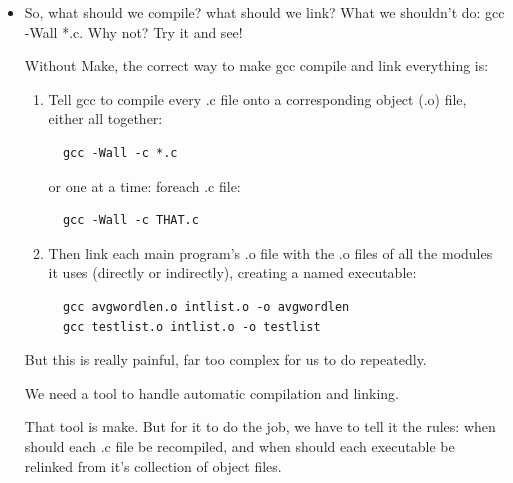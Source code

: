 \documentclass[aspectratio=169]{beamer}
\begin{document}
\begin{frame}[fragile]
    \begin{itemize}
    \item
    So, what should we compile?  what should we link?
    \pitem
    What we shouldn't do: \alert{gcc -Wall *.c}.  Why not?  Try it and see!

    \pitem
    Without Make, the correct way to make gcc compile and link everything is:

    \begin{enumerate}
    \pause
    \item
    Tell gcc to compile every .c file onto a corresponding object (.o) file, either all together:
\begin{verbatim}
  gcc -Wall -c *.c
\end{verbatim}
    or one at a time: foreach .c file:
\begin{verbatim}
  gcc -Wall -c THAT.c
\end{verbatim}

    \pause
    \item
    Then link each main program's .o file with the .o files of all the modules it uses (directly
    or indirectly), creating a named executable:

\begin{verbatim}
  gcc avgwordlen.o intlist.o -o avgwordlen
  gcc testlist.o intlist.o -o testlist
\end{verbatim}

    \end{enumerate}

    \pitem
    But this is really painful, far too complex for us to do repeatedly.

    \pitem
    We \alert{need a tool to handle automatic compilation and linking}.

    \pitem
    That tool is \alert{make}.
    \pause
    But for it to do the job, we have to \alert{tell it the rules}:
    when should each .c file be recompiled, and when should each executable be relinked from it's
    collection of object files.

    \end{itemize}

\end{frame}
\end{document}
